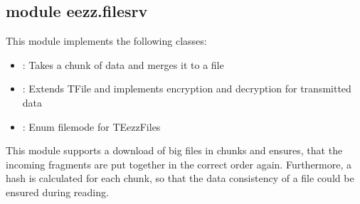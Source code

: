 \documentclass[letterpaper,10pt,english]{sphinxmanual}
\begin{document}
\subsection{module eezz.filesrv}
\label{\detokenize{eezz:module-eezz.filesrv}}\label{\detokenize{eezz:module-eezz-filesrv}}
\sphinxAtStartPar
This module implements the following classes:
\begin{itemize}
\item {} 
\sphinxAtStartPar
{}:        Takes a chunk of data and merges it to a file

\item {} 
\sphinxAtStartPar
{}:    Extends TFile and implements encryption and decryption for transmitted data

\item {} 
\sphinxAtStartPar
{}:    Enum file\sphinxhyphen{}mode for TEezzFiles

\end{itemize}

\sphinxAtStartPar
This module supports a download of big files in chunks and ensures, that the incoming fragments are
put together in the correct order again. Furthermore, a hash is calculated for each chunk, so that the
data consistency of a file could be ensured during reading.
\end{document}
